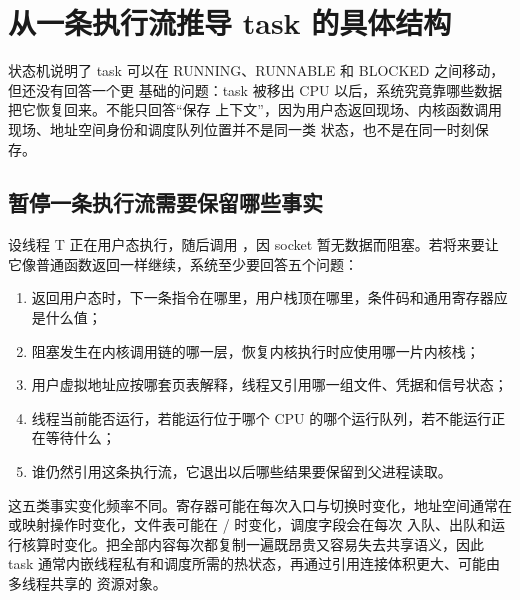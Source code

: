 \section{从一条执行流推导 task 的具体结构}

状态机说明了 task 可以在 RUNNING、RUNNABLE 和 BLOCKED 之间移动，但还没有回答一个更
基础的问题：task 被移出 CPU 以后，系统究竟靠哪些数据把它恢复回来。不能只回答“保存
上下文”，因为用户态返回现场、内核函数调用现场、地址空间身份和调度队列位置并不是同一类
状态，也不是在同一时刻保存。

\subsection{暂停一条执行流需要保留哪些事实}

设线程 T 正在用户态执行，随后调用 ，因 socket 暂无数据而阻塞。若将来要让
它像普通函数返回一样继续，系统至少要回答五个问题：

\begin{enumerate}
\tightlist
\item 返回用户态时，下一条指令在哪里，用户栈顶在哪里，条件码和通用寄存器应是什么值；
\item 阻塞发生在内核调用链的哪一层，恢复内核执行时应使用哪一片内核栈；
\item 用户虚拟地址应按哪套页表解释，线程又引用哪一组文件、凭据和信号状态；
\item 线程当前能否运行，若能运行位于哪个 CPU 的哪个运行队列，若不能运行正在等待什么；
\item 谁仍然引用这条执行流，它退出以后哪些结果要保留到父进程读取。
\end{enumerate}

这五类事实变化频率不同。寄存器可能在每次入口与切换时变化，地址空间通常在 
或映射操作时变化，文件表可能在 / 时变化，调度字段会在每次
入队、出队和运行核算时变化。把全部内容每次都复制一遍既昂贵又容易失去共享语义，因此
task 通常内嵌线程私有和调度所需的热状态，再通过引用连接体积更大、可能由多线程共享的
资源对象。


